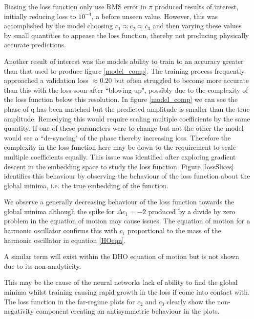 \documentclass[10pt]{iopart}
\begin{document}
Biasing the loss function only use RMS error in $\pi$ produced results of interest, initially reducing loss to $10^{-4}$, a before unseen value. However, this was accomplished by the model choosing $c_1\approx c_2\approx c_3$ and then varying these values by small quantities to appease the loss function, thereby not producing physically accurate predictions. 

Another result of interest was the models ability to train to an accuracy greater than that used to produce figure \ref{model_comp}. The training process frequently approached a validation loss $\approx 0.20$ but often struggled to become more accurate than this with the loss soon-after ``blowing up", possibly due to the complexity of the loss function below this resolution. In figure \ref{model_comp} we can see the phase of q has been matched but the predicted amplitude is smaller than the true amplitude. Remedying this would require scaling multiple coefficients by the same quantity. If one of these parameters were to change but not the other the model would see a ``de-syncing" of the phase thereby increasing loss. Therefore the complexity in the loss function here may be down to the requirement to scale multiple coefficients equally. This issue was identified after exploring gradient descent in the embedding space to study the loss function. Figure \ref{lossSlices} identifies this behaviour by observing the behaviour of the loss function about the global minima, i.e. the true embedding of the function.

We observe a generally decreasing behaviour of the loss function towards the global minima although the spike for $\Delta c_1 = -2$ produced by a divide by zero problem in the equation of motion may cause issues. The equation of motion for a harmonic oscillator confirms this with $c_1$ proportional to the mass of the harmonic oscillator in equation \ref{HOeqn}.



A similar term will exist within the DHO equation of motion but is not shown due to its non-analyticity. 

This may be the cause of  the neural networks lack of ability to find the global minima whilst training causing rapid growth in the loss if come into contact with. The loss function in the far-regime plots for $c_2$ and $c_3$ clearly show the non-negativity component creating an antisymmetric behaviour in the plots. 
\end{document}
